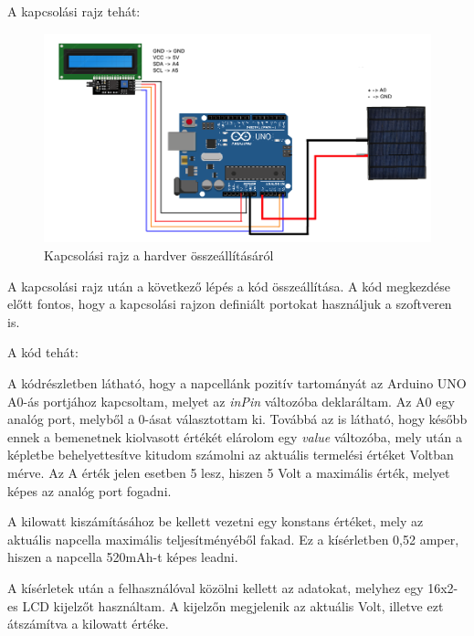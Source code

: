 \documentclass[
]{thesis-ekf}
\theoremstyle{definition}
\theoremstyle{remark}
\begin{document}
			\par A kapcsolási rajz tehát:
			\begin{figure}[ht]
				\centering
				\includegraphics[scale=0.30]{./images/solarCalculator}
				\caption{Kapcsolási rajz a hardver összeállításáról}
			\end{figure}
			\par A kapcsolási rajz után a következő lépés a kód összeállítása. A kód megkezdése előtt fontos, hogy a kapcsolási rajzon definiált portokat használjuk a szoftveren is.
			\par A kód tehát:
						
			A kódrészletben látható, hogy a napcellánk pozitív tartományát az Arduino UNO A0-ás portjához kapcsoltam, melyet az \textit{inPin} változóba deklaráltam. Az A0 egy analóg port, melyből a 0-ásat választottam ki. Továbbá az is látható, hogy később ennek a bemenetnek kiolvasott értékét elárolom egy \textit{value} változóba, mely után a képletbe behelyettesítve kitudom számolni az aktuális termelési értéket Voltban mérve. Az A érték jelen esetben 5 lesz, hiszen 5 Volt a maximális érték, melyet képes az analóg port fogadni.
			\par A kilowatt kiszámításához be kellett vezetni egy konstans értéket, mely az aktuális napcella maximális teljesítményéből fakad. Ez a kísérletben 0,52 amper, hiszen a napcella 520mAh-t képes leadni. 
			\par A kísérletek után a felhasználóval közölni kellett az adatokat, melyhez egy 16x2-es LCD kijelzőt használtam. A kijelzőn megjelenik az aktuális Volt, illetve ezt átszámítva a kilowatt értéke.
			
\end{document}
